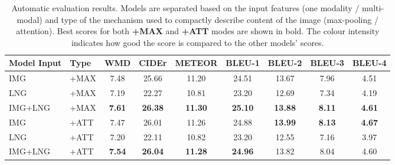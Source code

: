 \documentclass[11pt,a4paper]{article}
\begin{document}
\begin{table}[h]
  \footnotesize
 \centering
 \begin{tabular}{|l|l|c|c|c|c|c|c|c|}
 \hline
  \textbf{Model Input} & \textbf{Type} & \textbf{WMD} & \textbf{CIDEr} & \textbf{METEOR} & \textbf{BLEU-1} & \textbf{BLEU-2}
  & \textbf{BLEU-3} & \textbf{BLEU-4} \\
 \hline
  IMG & +MAX & \cellcolor{blue!18}7.48 & \cellcolor{blue!18}25.66 & \cellcolor{blue!18}11.20 & \cellcolor{blue!18}24.51 & \cellcolor{blue!18}13.67 & \cellcolor{blue!18}7.96 & \cellcolor{blue!18}4.51 \\
 \hline
  LNG & +MAX & \cellcolor{blue!10}7.19 & \cellcolor{blue!10}22.27 & \cellcolor{blue!10}10.81 & \cellcolor{blue!10}23.20 & \cellcolor{blue!10}12.69 & \cellcolor{blue!10}7.34 & \cellcolor{blue!10}4.19\\
 \hline
  IMG+LNG & +MAX & \cellcolor{blue!30}\textbf{7.61} & \cellcolor{blue!30}\textbf{26.38} &  \cellcolor{blue!30}\textbf{11.30} & \cellcolor{blue!30}\textbf{25.10} &  \cellcolor{blue!30}\textbf{13.88} &  \cellcolor{blue!30}\textbf{8.11} & \cellcolor{blue!30} \textbf{4.61} \\
 \hline
 \hline
  IMG & +ATT & \cellcolor{blue!18}7.47 & \cellcolor{blue!18}26.01& \cellcolor{blue!18}11.26 & \cellcolor{blue!18}24.88 &  \cellcolor{blue!30}\textbf{13.99} & \cellcolor{blue!30}\textbf{8.13} & \cellcolor{blue!30} \textbf{4.67} \\
 \hline
  LNG & +ATT & \cellcolor{blue!10}7.20 & \cellcolor{blue!10}22.11 & \cellcolor{blue!10}10.82 & \cellcolor{blue!10}23.20 & \cellcolor{blue!10}12.55 & \cellcolor{blue!10}7.16 & \cellcolor{blue!10}3.97 \\
 \hline
  IMG+LNG & +ATT & \cellcolor{blue!30}\textbf{7.54} & \cellcolor{blue!30}\textbf{26.04} & \cellcolor{blue!30} \textbf{11.28} & \cellcolor{blue!30}\textbf{24.96} & \cellcolor{blue!18}13.82 & \cellcolor{blue!18}8.04 & \cellcolor{blue!18}4.60 \\
   \hline
 \end{tabular}
  \caption{
  Automatic evaluation results. Models are separated based on the input features (one modality / multi-modal) and type of the mechanism used to compactly describe content of the image (max-pooling / attention).
  Best scores for both \textbf{+MAX} and \textbf{+ATT} modes are shown in bold.
  The colour intensity indicates how good the score is compared to the other models' scores.
  }
 \label{tab:accstats}
\end{table}
\end{document}
